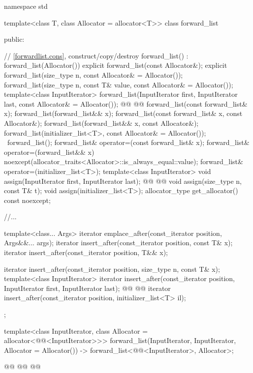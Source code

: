 \documentclass{wg21}
\begin{document}
\begin{codeblock}
namespace std {
    template<class T, class Allocator = allocator<T>>
    class forward_list {
        public:

        // \ref{forwardlist.cons}, construct/copy/destroy
        forward_list() : forward_list(Allocator()) { }
        explicit forward_list(const Allocator&);
        explicit forward_list(size_type n, const Allocator& = Allocator());
        forward_list(size_type n, const T& value, const Allocator& = Allocator());
        template<class InputIterator>
        forward_list(InputIterator first, InputIterator last, const Allocator& = Allocator());
        @@
        @@
        forward_list(const forward_list& x);
        forward_list(forward_list&& x);
        forward_list(const forward_list& x, const Allocator&);
        forward_list(forward_list&& x, const Allocator&);
        forward_list(initializer_list<T>, const Allocator& = Allocator());
        ~forward_list();
        forward_list& operator=(const forward_list& x);
        forward_list& operator=(forward_list&& x)
        noexcept(allocator_traits<Allocator>::is_always_equal::value);
        forward_list& operator=(initializer_list<T>);
        template<class InputIterator>
        void assign(InputIterator first, InputIterator last);
        @@
        @@
        void assign(size_type n, const T& t);
        void assign(initializer_list<T>);
        allocator_type get_allocator() const noexcept;

        //...

        template<class... Args> iterator emplace_after(const_iterator position, Args&&... args);
        iterator insert_after(const_iterator position, const T& x);
        iterator insert_after(const_iterator position, T&& x);

        iterator insert_after(const_iterator position, size_type n, const T& x);
        template<class InputIterator>
        iterator insert_after(const_iterator position, InputIterator first, InputIterator last);
        @@
        @@
        iterator insert_after(const_iterator position, initializer_list<T> il);

    };

    template<class InputIterator, class Allocator = allocator<@@<InputIterator>>>
    forward_list(InputIterator, InputIterator, Allocator = Allocator())
    -> forward_list<@@<InputIterator>, Allocator>;

    @@
    @@
    @@
}
\end{codeblock}
\end{document}
